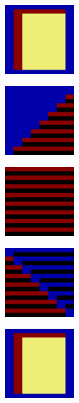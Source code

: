 \begin{figure}[H]
  {
    \setlength{\tabcolsep}{3.0pt}
    \setlength\cmidrulewidth{\heavyrulewidth} %
    \begin{adjustbox}{width=15cm,center}
      \begin{subfigure}{0.3\textwidth}
        \includegraphics[width=3cm]{src/bonusphase/row21_cell0.png}%
        \caption{}
      \end{subfigure}
      \begin{subfigure}{0.3\textwidth}
        \includegraphics[width=3cm]{src/bonusphase/row21_cell1.png}%
        \caption{}
      \end{subfigure}
      \begin{subfigure}{0.3\textwidth}
        \includegraphics[width=3cm]{src/bonusphase/row21_cell2.png}%
        \caption{}
      \end{subfigure}
      \begin{subfigure}{0.3\textwidth}
        \includegraphics[width=3cm]{src/bonusphase/row21_cell3.png}%
        \caption{}
      \end{subfigure}
      \begin{subfigure}{0.3\textwidth}
        \includegraphics[width=3cm]{src/bonusphase/row21_cell4.png}%
        \caption{}
      \end{subfigure}
    \end{adjustbox}
  }
\end{figure}
\captionsetup[subfigure]{font=footnotesize,labelfont=footnotesize,labelformat=empty}

